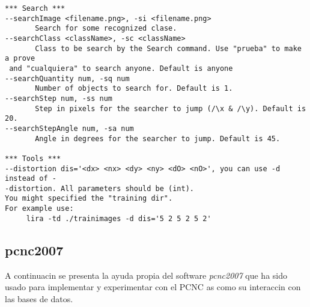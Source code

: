 \begin{verbatim}
*** Search ***
--searchImage <filename.png>, -si <filename.png>
       Search for some recognized clase.
--searchClass <className>, -sc <className>
       Class to be search by the Search command. Use "prueba" to make a prove
 and "cualquiera" to search anyone. Default is anyone
--searchQuantity num, -sq num
       Number of objects to search for. Default is 1.
--searchStep num, -ss num
       Step in pixels for the searcher to jump (/\x & /\y). Default is 20.
--searchStepAngle num, -sa num
       Angle in degrees for the searcher to jump. Default is 45.

*** Tools ***
--distortion dis='<dx> <nx> <dy> <ny> <dO> <nO>', you can use -d instead of -
-distortion. All parameters should be (int).
You might specified the "training dir".
For example use: 
	 lira -td ./trainimages -d dis='5 2 5 2 5 2' 
\end{verbatim}

\subsection{pcnc2007}
A continuacin se presenta la ayuda propia del software \emph{pcnc2007} que ha sido usado para implementar y experimentar con el PCNC as como su interaccin con las bases de datos.

